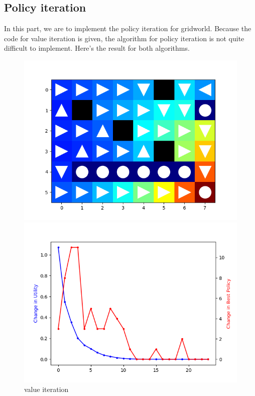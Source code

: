 \documentclass[aps,letterpaper,10pt]{revtex4}
\begin{document}
\subsection{Policy iteration}
In this part, we are to implement the policy iteration for gridworld. Because the code for value 
iteration is given, the algorithm for policy iteration is not quite difficult to implement. 
Here's the result for both algorithms.\\
\begin{figure}[htbp] 
    \centering 
    \begin{minipage}[t]{0.5\linewidth}
    \centering 
    \includegraphics[scale=0.5]{value.png} 
    \end{minipage}%
    \begin{minipage}[t]{0.5\linewidth} 
    \centering 
    \includegraphics[scale=0.5]{value_change.png} 
    \end{minipage}%
    \centering 
    \caption{value iteration} 
\end{figure}
\end{document}
